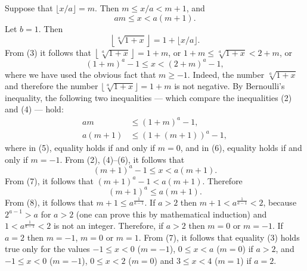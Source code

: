 \documentclass{article}
\begin{document}
Suppose that $\lfloor x/a \rfloor = m$. Then $m \leq x/a < m+1$, and
\begin{equation}
am \leq x < a(m+1). \tag{2}
\end{equation}
Let $b = 1$. Then
\begin{equation}
\left\lfloor \sqrt[a]{1 + x} \right\rfloor = 1 + \lfloor x/a \rfloor. \tag{3}
\end{equation}
From (3) it follows that $\left\lfloor \sqrt[a]{1+x} \right\rfloor = 1 + m$, or $1 + m \leq \sqrt[a]{1+x} < 2 + m$, or
\begin{equation}
(1+m)^a - 1 \leq x < (2+m)^a - 1, \tag{4}
\end{equation}
where we have used the obvious fact that $m \geq -1$. Indeed, the number $\sqrt[a]{1+x}$ and therefore the number $\lfloor \sqrt[a]{1+x} \rfloor = 1 + m$ is not negative. By Bernoulli's inequality, the following two inequalities --- which compare the inequalities (2) and (4) --- hold:
\begin{align}
am &\leq (1+m)^a - 1, \tag{5}\\
a(m+1) &\leq (1 + (m+1))^a - 1, \tag{6}
\end{align}
where in (5), equality holds if and only if $m = 0$, and in (6), equality holds if and only if $m = -1$.
From (2), (4)--(6), it follows that
\begin{equation}
(m+1)^a - 1 \leq x < a(m+1). \tag{7}
\end{equation}
From (7), it follows that $(m+1)^a - 1 < a(m+1)$. Therefore
\begin{equation}
(m+1)^a \leq a(m+1). \tag{8}
\end{equation}
From (8), it follows that $m+1 \leq a^{\frac{1}{a-1}}$. If $a > 2$ then $m + 1 < a^{\frac{1}{a-1}} < 2$, because $2^{a-1} > a$ for $a > 2$ (one can prove this by mathematical induction) and $1 < a^{\frac{1}{a-1}} < 2$ is not an integer. Therefore, if $a > 2$ then $m = 0$ or $m = -1$. If $a = 2$ then $m = -1$, $m = 0$ or $m = 1$. From (7), it follows that equality (3) holds true only for the values $-1 \leq x < 0$ ($m = -1$), $0 \leq x < a$ ($m = 0$) if $a > 2$, and $-1 \leq x < 0$ ($m = -1$), $0 \leq x < 2$ ($m = 0$) and $3 \leq x < 4$ ($m = 1$) if $a = 2$.
\end{document}
